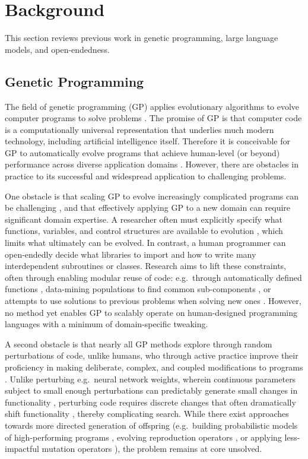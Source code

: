 \documentclass{article}
\begin{document}
\section{Background}

This section reviews previous work in genetic programming, large language models, and open-endedness.

\subsection{Genetic Programming}

The field of genetic programming (GP) applies evolutionary algorithms to evolve computer programs
to solve problems \cite{koza:book92,langdon2013foundations,banzhaf1998genetic}. 
The promise of GP is that computer code is a computationally
universal representation that underlies much modern technology, including artificial intelligence itself. Therefore it is conceivable for GP to automatically evolve programs that achieve human-level (or beyond) performance across diverse application domains \cite{koza2006genetic}. However, there are obstacles in practice to its successful and widespread application to challenging problems.

One obstacle is that scaling GP to evolve increasingly complicated programs can be challenging \cite{oneill:2010open}, and that effectively applying GP to a new domain can require significant domain expertise. A researcher often must explicitly specify what functions, variables, and control structures are available to evolution \cite{koza:book92,brameier2001comparison}, which limits what ultimately can be evolved. In contrast, a human programmer can open-endedly decide what libraries to import and how to write many interdependent subroutines or classes. Research aims to lift these constraints, often through enabling modular reuse of code: e.g.\ through automatically defined functions \cite{koza:book92}, data-mining populations to find common sub-components \cite{jonyer2006improving}, or attempts to use solutions to previous problems when solving new ones \cite{seront1995external}. However, no method yet enables GP to scalably operate on human-designed programming languages with a minimum of domain-specific tweaking. 

A second obstacle is that nearly all GP methods explore through random perturbations of code, unlike humans, who through active practice improve their proficiency in making deliberate, complex, and coupled modifications to programs \cite{gugerty1986debugging,li2015makes}. Unlike perturbing e.g.\ neural network weights, wherein continuous parameters subject to small enough perturbations can predictably generate small changes in functionality \cite{lehman2018safe,schulman:trpo}, perturbing code requires discrete changes that often dramatically shift functionality \cite{galvan2010towards}, thereby complicating search. While there exist approaches towards more directed generation of offspring (e.g.\ building probabilistic models of high-performing programs \cite{salustowicz1997probabilistic}, evolving reproduction operators \cite{spector2002genetic}, or applying less-impactful mutation operators \cite{galvan2010towards}), the problem remains at core unsolved.
\end{document}
